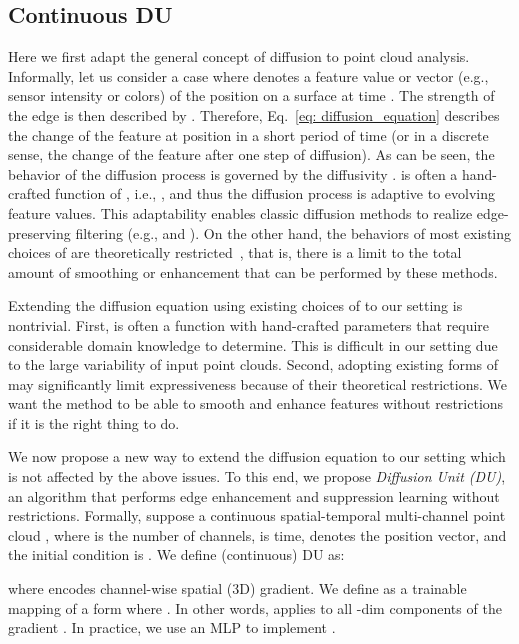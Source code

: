 \documentclass[a4paper,fleqn]{cas-dc}
\begin{document}
\subsection{Continuous DU}
\label{sec: diffusion_unit}
Here we first adapt the general concept of diffusion to point cloud analysis. Informally, let us consider a case where  denotes a feature value or vector (e.g., sensor intensity or colors) of the position  on a surface at time . The strength of the edge is then described by . Therefore, Eq.~\eqref{eq: diffusion_equation} describes the change of the feature at position  in a short period of time (or in a discrete sense, the change of the feature after one step of diffusion). As can be seen, the behavior of the diffusion process is governed by the diffusivity .  is often a hand-crafted function of , i.e., , and thus the diffusion process is adaptive to evolving feature values. This adaptability enables classic diffusion methods to realize edge-preserving filtering (e.g., \cite{perona1990scale} and \cite{black1998robust}). On the other hand, the behaviors of most existing choices of  are theoretically restricted~\cite{weickert1998anisotropic}, that is, there is a limit to the total amount of smoothing or enhancement that can be performed by these methods.       

Extending the diffusion equation using existing choices of  to our setting is nontrivial. First,  is often a function with hand-crafted parameters that require considerable domain knowledge to determine. This is difficult in our setting due to the large variability of input point clouds. Second, adopting existing forms of  may significantly limit expressiveness because of their theoretical restrictions. We want the method to be able to smooth and enhance features without restrictions if it is the right thing to do.     

We now propose a new way to extend the diffusion equation to our setting which is not affected by the above issues. To this end, we propose \textit{Diffusion Unit (DU)}, an algorithm that performs edge enhancement and suppression learning without restrictions.  
Formally, suppose a continuous spatial-temporal multi-channel point cloud , where  is the number of channels,  is time,  denotes the position vector, and the initial condition is .
We define (continuous) DU as:
 
where  encodes channel-wise spatial (3D) gradient. We define  as a trainable mapping of a form  where . In other words,  applies  to all -dim components of the gradient . In practice, we use an MLP to implement .  
\end{document}
